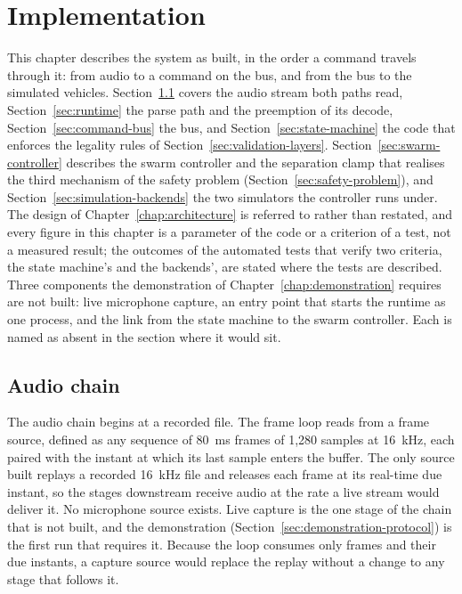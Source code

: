 \chapter{Implementation}
\label{chap:implementation}
This chapter describes the system as built, in the order a command travels through it: from
audio to a command on the bus, and from the bus to the simulated vehicles.
Section~\ref{sec:audio-chain} covers the audio stream both paths read, Section~\ref{sec:runtime}
the parse path and the preemption of its decode, Section~\ref{sec:command-bus} the bus, and
Section~\ref{sec:state-machine} the code that enforces the legality rules of
Section~\ref{sec:validation-layers}. Section~\ref{sec:swarm-controller} describes the swarm
controller and the separation clamp that realises the third mechanism of the safety problem
(Section~\ref{sec:safety-problem}), and Section~\ref{sec:simulation-backends} the two simulators
the controller runs under. The design of Chapter~\ref{chap:architecture} is referred to rather than
restated, and every figure in this chapter is a parameter of the code or a criterion of a test, not
a measured result; the outcomes of the automated tests that verify two criteria, the state
machine's and the backends', are stated where the tests are described. Three
components the demonstration of Chapter~\ref{chap:demonstration} requires are not built: live
microphone capture, an entry point that starts the runtime as one process, and the link from the
state machine to the swarm controller. Each is named as absent in the section where it would sit.

\section{Audio chain}
\label{sec:audio-chain}
The audio chain begins at a recorded file. The frame loop reads from a frame source, defined as
any sequence of 80~ms frames of 1{,}280 samples at 16~kHz, each paired with the instant at which
its last sample enters the buffer. The only source built replays a recorded 16~kHz file and
releases each frame at its real-time due instant, so the stages downstream receive audio at the
rate a live stream would deliver it. No microphone source exists. Live capture is the one stage of
the chain that is not built, and the demonstration (Section~\ref{sec:demonstration-protocol}) is
the first run that requires it. Because the loop consumes only frames and their due instants, a
capture source would replace the replay without a change to any stage that follows it.

